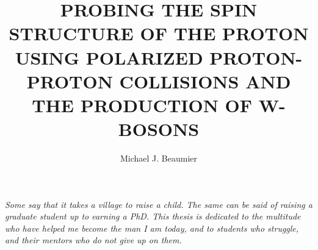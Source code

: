\documentclass[11pt, draft, oneside, letterpaper]{ucr}
\begin{document}

\title{PROBING THE SPIN STRUCTURE OF THE PROTON USING POLARIZED PROTON-PROTON
COLLISIONS AND THE PRODUCTION OF W-BOSONS}
\author{Michael J. Beaumier}

\maketitle
\copyrightpage{}
\approvalpage{}


\begin{frontmatter}

\begin{acknowledgements}
	
\end{acknowledgements}

\begin{dedication}
\null\vfil
{\large
\begin{center}
  \textit{
	Some say that it takes a village to raise a child. The same can be said of
	raising a graduate student up to earning a PhD. This thesis is dedicated to
	the multitude who have helped me become the man I am today, and to students
	who struggle, and their mentors who do not give up on them. \\
}
\end{center}}
\vfil\null
\end{dedication}



\tableofcontents
\listoffigures
\listoftables
\end{frontmatter}














\end{document}

